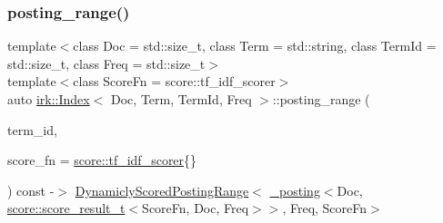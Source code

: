 \mbox{\label{classirk_1_1Index_ac777d1db0267b0e6191700e91a8eafa3}} 
\subsubsection{\texorpdfstring{posting\+\_\+range()}{posting\_range()}\hspace{0.1cm}{\footnotesize\ttfamily [2/2]}}
{\footnotesize\ttfamily template$<$class Doc  = std\+::size\+\_\+t, class Term  = std\+::string, class Term\+Id  = std\+::size\+\_\+t, class Freq  = std\+::size\+\_\+t$>$ \\
template$<$class Score\+Fn  = score\+::tf\+\_\+idf\+\_\+scorer$>$ \\
auto \mbox{\hyperlink{classirk_1_1Index}{irk\+::\+Index}}$<$ Doc, Term, Term\+Id, Freq $>$\+::posting\+\_\+range (\begin{DoxyParamCaption}\item[{Term\+Id}]{term\+\_\+id,  }\item[{Score\+Fn}]{score\+\_\+fn = {\ttfamily \mbox{\hyperlink{structirk_1_1score_1_1tf__idf__scorer}{score\+::tf\+\_\+idf\+\_\+scorer}}\{\}} }\end{DoxyParamCaption}) const -\/$>$ \mbox{\hyperlink{classirk_1_1DynamiclyScoredPostingRange}{Dynamicly\+Scored\+Posting\+Range}}$<$
            \mbox{\hyperlink{structirk_1_1__posting}{\+\_\+posting}}$<$Doc, \mbox{\hyperlink{namespaceirk_1_1score_af4a2c84b3548a4ac12aac3862bc94875}{score\+::score\+\_\+result\+\_\+t}}$<$Score\+Fn, Doc, Freq$>$$>$,
            Freq,
            Score\+Fn$>$
    \hspace{0.3cm}{\ttfamily [inline]}}

\mbox{\label{classirk_1_1Index_a4ccbee8e961b0e219ab424f7ddc9301b}} 
